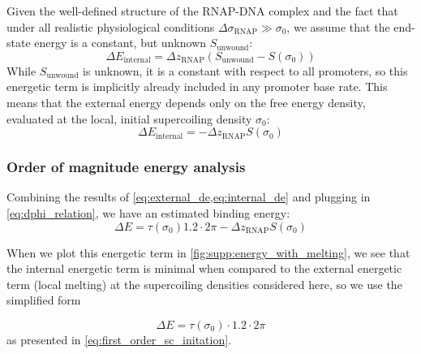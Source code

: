 \documentclass[11pt]{article} %
\begin{document}
Given the well-defined structure of the RNAP-DNA complex and the fact that under all realistic physiological conditions \(\Delta \sigma_\text{RNAP} \gg \sigma_0\), we assume that the end-state energy is a constant, but unknown \(S_\text{unwound}\):
\begin{equation}
    \Delta E_\text{internal} = \Delta z_\text{RNAP} \left(S_\text{unwound} - S(\sigma_0)\right)
\end{equation}
While \(S_\text{unwound}\) is unknown, it is a constant with respect to all promoters, so this energetic term is implicitly already included in any promoter base rate. This means that the external energy depends only on the free energy density, evaluated at the local, initial supercoiling density \(\sigma_0\):
\begin{equation}
    \Delta E_\text{internal} = -\Delta z_\text{RNAP} S(\sigma_0) \label{eq:internal_de}
\end{equation}

\subsubsection{Order of magnitude energy analysis}
Combining the results of \cref{eq:external_de,eq:internal_de} and plugging in \cref{eq:dphi_relation}, we have an estimated binding energy:
\begin{equation}
    \Delta E = \tau(\sigma_0) 1.2 \cdot 2\pi - \Delta z_\text{RNAP} S(\sigma_0)
\end{equation}

When we plot this energetic term in \cref{fig:supp:energy_with_melting}, we see that the internal energetic term is minimal when compared to the external energetic term (local melting) at the supercoiling densities considered here, so we use the simplified form

\begin{equation}
    \Delta E = \tau(\sigma_0) \cdot 1.2 \cdot 2\pi
\end{equation}
as presented in \cref{eq:first_order_sc_initation}.
\end{document}
